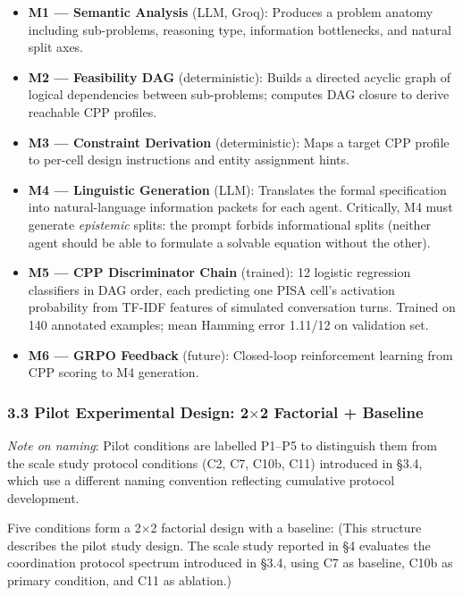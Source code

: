 \documentclass[
  11pt,
]{article}
\providecommand{\tightlist}{%
  \setlength{\itemsep}{0pt}\setlength{\parskip}{0pt}}
\begin{document}
\begin{itemize}
\tightlist
\item
  \textbf{M1 --- Semantic Analysis} (LLM, Groq): Produces a problem
  anatomy including sub-problems, reasoning type, information
  bottlenecks, and natural split axes.
\item
  \textbf{M2 --- Feasibility DAG} (deterministic): Builds a directed
  acyclic graph of logical dependencies between sub-problems; computes
  DAG closure to derive reachable CPP profiles.
\item
  \textbf{M3 --- Constraint Derivation} (deterministic): Maps a target
  CPP profile to per-cell design instructions and entity assignment
  hints.
\item
  \textbf{M4 --- Linguistic Generation} (LLM): Translates the formal
  specification into natural-language information packets for each
  agent. Critically, M4 must generate \emph{epistemic} splits: the
  prompt forbids informational splits (neither agent should be able to
  formulate a solvable equation without the other).
\item
  \textbf{M5 --- CPP Discriminator Chain} (trained): 12 logistic
  regression classifiers in DAG order, each predicting one PISA cell's
  activation probability from TF-IDF features of simulated conversation
  turns. Trained on 140 annotated examples; mean Hamming error 1.11/12
  on validation set.
\item
  \textbf{M6 --- GRPO Feedback} (future): Closed-loop reinforcement
  learning from CPP scoring to M4 generation.
\end{itemize}

\subsubsection{3.3 Pilot Experimental Design: 2$\times$2 Factorial +
Baseline}\label{experimental-design-22-factorial-baseline}

\emph{Note on naming}: Pilot conditions are labelled P1--P5 to distinguish them from the scale study protocol conditions (C2, C7, C10b, C11) introduced in §3.4, which use a different naming convention reflecting cumulative protocol development.

Five conditions form a 2$\times$2 factorial design with a baseline: (This structure describes the pilot study design. The scale study reported in §4 evaluates the coordination protocol spectrum introduced in §3.4, using C7 as baseline, C10b as primary condition, and C11 as ablation.)
\end{document}
